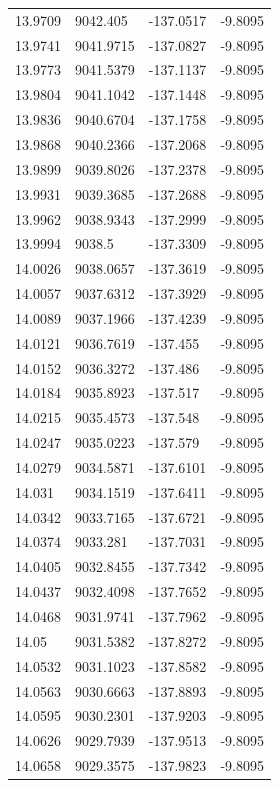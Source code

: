 \begin{table}[H]
\begin{tabular}{llll}
13.9709 & 9042.405 & -137.0517 & -9.8095 \\
13.9741 & 9041.9715 & -137.0827 & -9.8095 \\
13.9773 & 9041.5379 & -137.1137 & -9.8095 \\
13.9804 & 9041.1042 & -137.1448 & -9.8095 \\
13.9836 & 9040.6704 & -137.1758 & -9.8095 \\
13.9868 & 9040.2366 & -137.2068 & -9.8095 \\
13.9899 & 9039.8026 & -137.2378 & -9.8095 \\
13.9931 & 9039.3685 & -137.2688 & -9.8095 \\
13.9962 & 9038.9343 & -137.2999 & -9.8095 \\
13.9994 & 9038.5 & -137.3309 & -9.8095 \\
14.0026 & 9038.0657 & -137.3619 & -9.8095 \\
14.0057 & 9037.6312 & -137.3929 & -9.8095 \\
14.0089 & 9037.1966 & -137.4239 & -9.8095 \\
14.0121 & 9036.7619 & -137.455 & -9.8095 \\
14.0152 & 9036.3272 & -137.486 & -9.8095 \\
14.0184 & 9035.8923 & -137.517 & -9.8095 \\
14.0215 & 9035.4573 & -137.548 & -9.8095 \\
14.0247 & 9035.0223 & -137.579 & -9.8095 \\
14.0279 & 9034.5871 & -137.6101 & -9.8095 \\
14.031 & 9034.1519 & -137.6411 & -9.8095 \\
14.0342 & 9033.7165 & -137.6721 & -9.8095 \\
14.0374 & 9033.281 & -137.7031 & -9.8095 \\
14.0405 & 9032.8455 & -137.7342 & -9.8095 \\
14.0437 & 9032.4098 & -137.7652 & -9.8095 \\
14.0468 & 9031.9741 & -137.7962 & -9.8095 \\
14.05 & 9031.5382 & -137.8272 & -9.8095 \\
14.0532 & 9031.1023 & -137.8582 & -9.8095 \\
14.0563 & 9030.6663 & -137.8893 & -9.8095 \\
14.0595 & 9030.2301 & -137.9203 & -9.8095 \\
14.0626 & 9029.7939 & -137.9513 & -9.8095 \\
14.0658 & 9029.3575 & -137.9823 & -9.8095 \\

\end{tabular}
\end{table}
